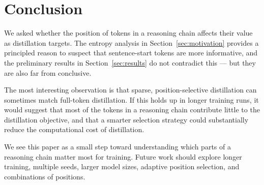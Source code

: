 \documentclass{article}
\begin{document}
\section{Conclusion}

We asked whether the position of tokens in a reasoning chain affects their value as distillation targets.
The entropy analysis in Section~\ref{sec:motivation} provides a principled reason to suspect that sentence-start tokens are more informative, and the preliminary results in Section~\ref{sec:results} do not contradict this — but they are also far from conclusive.

The most interesting observation is that sparse, position-selective distillation can sometimes match full-token distillation.
If this holds up in longer training runs, it would suggest that most of the tokens in a reasoning chain contribute little to the distillation objective, and that a smarter selection strategy could substantially reduce the computational cost of distillation.

We see this paper as a small step toward understanding which parts of a reasoning chain matter most for training.
Future work should explore longer training, multiple seeds, larger model sizes, adaptive position selection, and combinations of positions.
\end{document}

